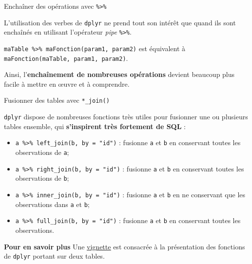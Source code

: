 \documentclass[12pt,handout,ignorenonframetext,]{beamer}
\newenvironment{Shaded}{}{}
\newcommand{\KeywordTok}[1]{\textcolor[rgb]{0.00,0.00,1.00}{{#1}}}
\newcommand{\DataTypeTok}[1]{{#1}}
\newcommand{\DecValTok}[1]{{#1}}
\newcommand{\StringTok}[1]{\textcolor[rgb]{0.00,0.50,0.50}{{#1}}}
\newcommand{\OtherTok}[1]{\textcolor[rgb]{1.00,0.25,0.00}{{#1}}}
\newcommand{\NormalTok}[1]{{#1}}
\providecommand{\tightlist}{%
\setlength{\itemsep}{0pt}\setlength{\parskip}{0pt}}
\renewenvironment{Shaded}{\begin{snugshade}}{\end{snugshade}}
\begin{document}
\begin{frame}[fragile]{Enchaîner des opérations avec
\texttt{\%\textgreater{}\%}}

L'utilisation des verbes de \texttt{dplyr} ne prend tout son intérêt que
quand ils sont enchaînés en utilisant l'opérateur \emph{pipe}
\texttt{\%\textgreater{}\%}.

\texttt{maTable\ \%\textgreater{}\%\ maFonction(param1,\ param2)} est
équivalent à \texttt{maFonction(maTable,\ param1,\ param2)}.

\pause Ainsi, l'\textbf{enchaînement de nombreuses opérations} devient
beaucoup plus facile à mettre en \oe uvre et à comprendre.

\pause \footnotesize

\begin{Shaded}
\end{Shaded}

\end{frame}

\begin{frame}[fragile]{Fusionner des tables avec \texttt{*\_join()}}

\texttt{dplyr} dispose de nombreuses fonctions très utiles pour
fusionner une ou plusieurs tables ensemble, qui \textbf{s'inspirent très
fortement de SQL} :

\begin{itemize}
\tightlist
\item
  \texttt{a\ \%\textgreater{}\%\ left\_join(b,\ by\ =\ "id")} : fusionne
  \texttt{a} et \texttt{b} en conservant toutes les observations de
  \texttt{a};
\item
  \texttt{a\ \%\textgreater{}\%\ right\_join(b,\ by\ =\ "id")} :
  fusionne \texttt{a} et \texttt{b} en conservant toutes les
  observations de \texttt{b};
\item
  \texttt{a\ \%\textgreater{}\%\ inner\_join(b,\ by\ =\ "id")} :
  fusionne \texttt{a} et \texttt{b} en ne conservant que les
  observations dans \texttt{a} et \texttt{b};
\item
  \texttt{a\ \%\textgreater{}\%\ full\_join(b,\ by\ =\ "id")} : fusionne
  \texttt{a} et \texttt{b} en conservant toutes les observations.
\end{itemize}

\textbf{Pour en savoir plus} Une
\href{https://cran.r-project.org/web/packages/dplyr/vignettes/two-table.html}{\underline{vignette}}
est consacrée à la présentation des fonctions de \texttt{dplyr} portant
sur deux tables.

\end{frame}
\end{document}
